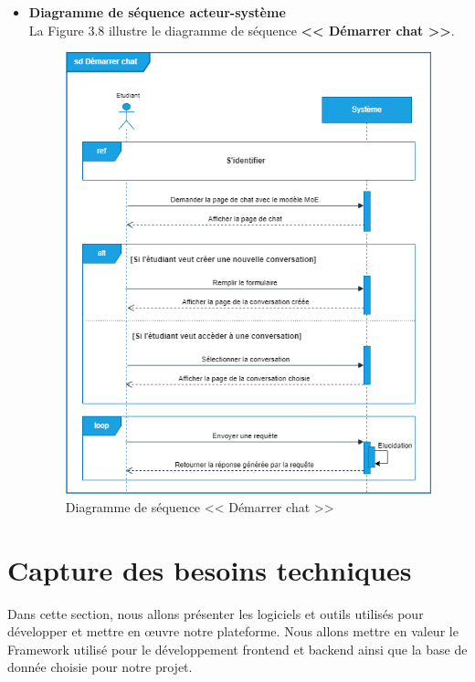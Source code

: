\begin{itemize}[itemsep=1pt, parsep=1pt]
    \item \textbf{Diagramme de séquence acteur-système}\\
    La Figure 3.8 illustre le diagramme de séquence \textbf{<< Démarrer chat >>}.
     \begin{figure}[H]
        \centering
        \includegraphics[width=1.1\textwidth,height=0.85\textheight]{images/chp3/fig8.png}     
           \caption{Diagramme de séquence << Démarrer chat >>}        
        \label{fig:Diagramme de séquence << Démarrer chat >>}    
    \end{figure}
    
\end{itemize}

\section{Capture des besoins techniques}
Dans cette section, nous allons présenter les logiciels et outils utilisés pour développer et mettre en œuvre notre plateforme. Nous allons mettre en valeur le Framework utilisé pour le développement frontend et backend ainsi que la base de donnée choisie pour notre projet.

